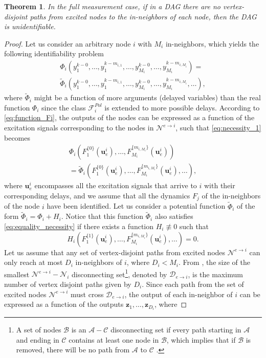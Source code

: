 \documentclass[letterpaper,10pt,journal]{IEEEtran}
\newcommand{\Fthree}{\mathcal{F}^{Pol}}
\newcommand{\z}{\mathbf{z}}
\newcommand{\uu}{\mathbf{u}}
\newtheorem{theorem}{Theorem}
\newcommand{\NN}{\mathcal{N}}
\begin{document}
\begin{theorem}\label{thm:necessity}
    In the full measurement case, if in a DAG there are no vertex-disjoint paths from excited nodes to the in-neighbors of each node, then the DAG is unidentifiable.

\end{theorem}
\begin{proof}
    Let us consider an arbitrary node $i$ with $M_i$ in-neighbors, which yields the following identifiability problem
\begin{multline}\label{eq:necessity_1}
\Phi_i(y_1^{k-0},\ldots,y_1^{k-m_{i,1}},\ldots,y_{M_i}^{k-0},\ldots,y_{M_i}^{k-m_{i,M_i}})=\\
\tilde \Phi_i(y_1^{k-0},\ldots,y_1^{k-m_{i,1}},\ldots,y_{M_i}^{k-0},\ldots,y_{M_i}^{k-m_{i,M_i}},\ldots),    
\end{multline}
where $\tilde \Phi_i$ might be a function of more arguments (delayed variables) than the real function $\Phi_i$ since the class $\Fthree_i$ is extended to more possible delays. 
According to \eqref{eq:function_Fi}, the outputs of the nodes can be expressed as a function of the excitation signals corresponding to the nodes in $\NN^{e\to i}$, such that \eqref{eq:necessity_1} becomes
\begin{multline}\label{eq:equality_necessity}
    \Phi_i(F_1^{\{0\}}(\uu_e^i),\ldots,F_{M_i}^{\{m_{i,M_i}\}}(\uu_e^i))\\
    =\tilde \Phi_i(F_1^{\{0\}}(\uu_e^i),\ldots,F_{M_i}^{\{m_{i,M_i}\}}(\uu_e^i),\ldots),
\end{multline}
where $\uu_e^i$ encompasses all the excitation signals that arrive to $i$ with their corresponding delays, and we assume that all the dynamics $F_j$ of the in-neighbors of the node $i$ have been identified. Let us consider a potential function $\tilde\Phi_i$ of the form $\tilde\Phi_i=\Phi_i+H_i$. Notice that this function $\tilde\Phi_i$ also satisfies \eqref{eq:equality_necessity} if there exists a function $H_i\not\equiv0$ such that
\begin{equation}\label{eq:necessity_0}
H_i(F_1^{\{1\}}(\uu_e^i),\ldots,F_{M_i}^{\{m_{i,M_i}\}}(\uu_e^i),\ldots)=0.
\end{equation} 
Let us assume that any set of vertex-disjoint paths from excited nodes $\NN^{e\to i}$ can only reach at most $D_i$ in-neighbors of $i$, where $D_i<M_i$. 
From \cite[Lemma~V.3]{hendrickx2019identifiability}, the size of the smallest $\NN^{e\to i}-\NN_i$ disconnecting set\footnote{A set of nodes $\mathcal{B}$ is an $\mathcal{A}-\mathcal{C}$ disconnecting set if every path starting in $\mathcal{A}$ and ending in $\mathcal{C}$ contains at least one node in $\mathcal{B}$, which implies that if $\mathcal{B}$ is removed, there will be no path from $\mathcal{A}$ to $\mathcal{C}$ \cite{hendrickx2019identifiability}.}, denoted by $\mathcal{D}_{e\to i}$, is the maximum number of vertex disjoint paths given by $D_i$. Since each path from the set of excited nodes $\NN^{e\to i}$ must cross $\mathcal{D}_{e\to i}$, the output of each in-neighbor of $i$ can be expressed as a function of the outputs $\z_1,\ldots,\z_{D_i}$, where

\end{proof}
\end{document}
